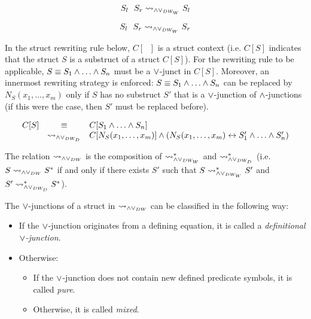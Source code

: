 \documentclass{llncs}
\begin{document}
\begin{definition}[$\normalizePlusTimesDW$]
\begin{multicols}{4}
{$$
S_l \hF{\structplus} S_r \normalizePlusTimesDWw  S_l
$$

$$
S_l \hF{\structplus} S_r \normalizePlusTimesDWw  S_r
$$

}\end{multicols}

In the struct rewriting rule below, $C[\phantom{S}]$ is a struct context (i.e. $C[S]$ indicates that the struct $S$ is a substruct of a struct $C[S]$). For the rewriting rule to be applicable, $S \equiv S_1 \wedge \ldots \wedge S_n$ must be a $\vee$-junct in $C[S]$. Moreover, an innermost rewriting strategy is enforced: $S \equiv S_1 \wedge \ldots \wedge S_n$ can be replaced by $N_{S}(x_1,\ldots, x_m)$ only if $S$ has no substruct $S'$ that is a $\vee$-junction of $\wedge$-junctions (if this were the case, then $S'$ must be replaced before).


$$
\begin{array}{rcl}
C[S]  & \equiv & C[S_1 \wedge \ldots \wedge S_n] \\ 
		& \leadsto_{\wedge\vee_{DW_D}} & 
C[N_{S}(x_1,\ldots, x_m)] \wedge (N_{S}(x_1,\ldots, x_m) \leftrightarrow S'_1 \wedge \ldots \wedge S'_n)
\end{array}
$$

\medskip

The relation $\normalizePlusTimesDW$ is the composition of $\leadsto_{\wedge\vee_{DW_W}}^*$ and $\leadsto_{\wedge\vee_{DW_D}}^*$ (i.e. $S \leadsto_{\wedge\vee_{DW}} S^*$ if and only if there exists $S'$ such that $S \leadsto_{\wedge\vee_{DW_W}}^* S'$ and $S' \leadsto_{\wedge\vee_{DW_D}}^* S^*$).

The $\vee$-junctions of a struct in $\normalizePlusTimesDW$ can be classified in the following way:
\begin{itemize}
	\item If the $\vee$-junction originates from a defining equation, it is called a \emph{definitional $\vee$-junction}.

	\item Otherwise:
		\begin{itemize}
			\item If the $\vee$-junction does not contain new defined predicate symbols, it is called \emph{pure}.

			\item Otherwise, it is called \emph{mixed}.
		\end{itemize}

\end{itemize}

\end{definition}
\end{document}

